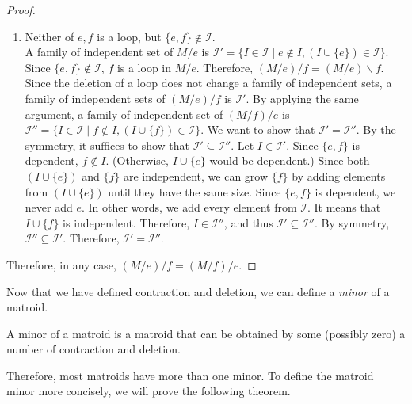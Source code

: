 \begin{proof}
\begin{enumerate}
\item Neither of $e, f$ is a loop, but $\{ e, f \} \notin \mathcal{I}$.\\
A family of independent set of $M / e$ is $\mathcal{I}' = \{ I \in \mathcal{I} \mid e \notin I, (I \cup \{ e \}) \in \mathcal{I} \}$.
Since $\{ e, f \} \notin \mathcal{I}$, $f$ is a loop in $M / e$.
Therefore, $(M / e) / f = (M / e) \backslash f$.
Since the deletion of a loop does not change a family of independent sets, a family of independent sets of $(M / e) / f$ is $\mathcal{I}'$.
By applying the same argument, a family of independent set of $(M / f) / e$ is $\mathcal{I}'' = \{ I \in \mathcal{I} \mid f \notin I, (I \cup \{ f \} ) \in \mathcal{I} \}$.
We want to show that $\mathcal{I}'  = \mathcal{I}''$.
By the symmetry, it suffices to show that $\mathcal{I}' \subseteq \mathcal{I}''$.
Let $I \in \mathcal{I}'$.
Since $\{ e, f \}$ is dependent, $f \notin I$. (Otherwise, $I \cup \{ e \}$ would be dependent.)
Since both $(I \cup \{ e \})$ and $\{ f \}$ are independent, we can grow $\{ f \}$ by adding elements from $(I \cup \{ e \})$ until they have the same size.
Since $\{ e, f\}$ is dependent, we never add $e$.
In other words, we add every element from $\mathcal{I}$.
It means that $I \cup \{ f \}$ is independent.
Therefore, $I \in \mathcal{I}''$, and thus $\mathcal{I}' \subseteq \mathcal{I}''$.
By symmetry, $\mathcal{I}'' \subseteq \mathcal{I}'$.
Therefore, $\mathcal{I}' = \mathcal{I}''$.
\end{enumerate}

Therefore, in any case, $(M / e) / f = (M / f) / e$.
\end{proof}



Now that we have defined contraction and deletion, we can define a \textit{minor} of a matroid.

\begin{defn}
A minor of a matroid is a matroid that can be obtained by some (possibly zero) a number of contraction and deletion.
\end{defn}

Therefore, most matroids have more than one minor.
To define the matroid minor more concisely, we will prove the following theorem.



